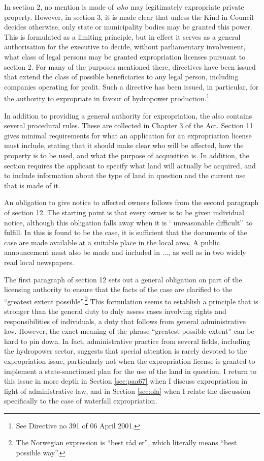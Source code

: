 In section 2, no mention is made of {\it who} may legitimately expropriate private property. However, in section 3, it is made clear that unless the Kind in Council decides otherwise, only state or municipality bodies may be granted this power. This is formulated as a limiting principle, but in effect it serves as a general authorisation for the executive to decide, without parliamentary involvement, what class of legal persons may be granted expropriation licenses pursuant to section 2. For many of the purposes mentioned there, directives have been issued that extend the class of possible beneficiaries to any legal person, including companies operating for profit. Such a directive has been issued, in particular, for the authority to expropriate in favour of hydropower production.\footnote{See Directive no 391 of 06 April 2001.}

In addition to providing a general authority for expropriation, the \cite{ea59} also contains several procedural rules. These are collected in Chapter 3 of the Act. Section 11 gives minimal requirements for what an application for an expropriation license must include, stating that it should make clear who will be affected, how the property is to be used, and what the purpose of acquisition is. In addition, the section requires the applicant to specify what land will actually be acquired, and to include information about the type of land in question and the current use that is made of it.

An obligation to give notice to affected owners follows from the second paragraph of section 12. The starting point is that every owner is to be given individual notice, although this obligation falls away when it is ` unreasonable difficult'' to fulfill. In this is found to be the case, it is sufficient that the documents of the case are made available at a suitable place in the local area. A public announcement must also be made and included in ..., as well as in two widely read local newspapers.

The first paragraph of section 12 sets out a general obligation on part of the licensing authority to ensure that the facts of the case are clarified to the ``greatest extent possible''.\footnote{The Norwegian expression is ``best råd er'', which literally means ``best possible way''.} This formulation seems to establish a principle that is stronger than the general duty to duly assess cases involving rights and responsibilities of individuals, a duty that follows from general administrative law. However, the exact meaning of the phrase  ``greatest possible extent'' can be hard to pin down. In fact, administrative practice from several fields, including the hydropower sector, suggests that special attention is rarely devoted to the expropriation issue, particularly not when the expropriation license is granted to implement a state-sanctioned plan for the use of the land in question. I return to this issue in more depth in Section \ref{sec:paa67} when I discuss expropriation in light of administrative law, and in Section \ref{sec:ola} when I relate the discussion specifically to the case of waterfall expropriation.

